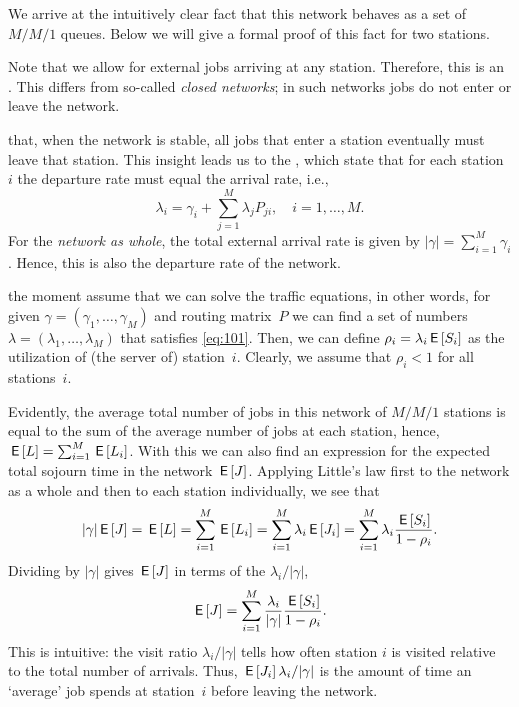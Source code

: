 We arrive at the intuitively clear fact that this network behaves as a set of $M/M/1$ queues. Below we will give a formal proof of this fact for two stations.


Note that we allow for external jobs arriving at any station.
Therefore, this is an .
This differs from so-called \emph{closed networks}; in such networks jobs do not enter or leave the network.

 that, when the network is stable, all jobs that enter a station eventually must leave that station.
This insight leads us to the , which state that for each station $i$ the departure rate must equal the arrival rate, i.e.,
\begin{equation}\label{eq:101}
  \lambda_i = \gamma_i + \sum_{j=1}^M \lambda_j P_{j i}, \quad i = 1, \ldots, M.
\end{equation}
For the \emph{network as whole}, the total external arrival rate is given by $|\gamma|= \sum_{i=1}^M \gamma_i$.
Hence, this is also the departure rate of the network.

 the moment assume that we can solve the traffic equations, in other words, for given $\gamma =(\gamma_1, \ldots, \gamma_M)$ and routing matrix~$P$ we can find a set of numbers $\lambda =(\lambda_1, \ldots, \lambda_M)$  that satisfies \cref{eq:101}.
Then, we can define $\rho_i = \lambda_i \,\mathsf{E}\left[S_i\right]$ as the utilization of (the server of) station~$i$.
Clearly, we assume that $\rho_i < 1$ for all stations~$i$.

Evidently, the average total number of jobs in this network of $M/M/1$ stations is equal to the sum of the average number of jobs at each station, hence,
$\,\mathsf{E}\left[L\right] = \sum_{i=1}^M \,\mathsf{E}\left[L_i\right]$.
With this we can also find an expression for the expected total sojourn time in the network $\,\mathsf{E}\left[J\right]$.
Applying Little's law first to the network as a whole and then to each station individually, we see that
\begin{equation*}
  |\gamma| \,\mathsf{E}\left[J\right] = \,\mathsf{E}\left[L\right] = \sum_{i=1}^M \,\mathsf{E}\left[L_i\right] = \sum_{i=1}^M \lambda_i \,\mathsf{E}\left[J_i\right] = \sum_{i=1}^M \lambda_i \frac{\,\mathsf{E}\left[S_i\right]}{1-\rho_i}.
\end{equation*}
Dividing by $|\gamma|$ gives  $\,\mathsf{E}\left[J\right]$  in terms of the  $\lambda_i/|\gamma|$,
\begin{equation*}
 \,\mathsf{E}\left[J\right] = \sum_{i=1}^M \frac{\lambda_i}{|\gamma|} \frac{\,\mathsf{E}\left[S_i\right]}{1-\rho_i}.
\end{equation*}
This is intuitive: the visit ratio $\lambda_i/|\gamma|$ tells how often station $i$ is visited relative to the total number of arrivals.
Thus, $\,\mathsf{E}\left[J_i\right] \lambda_i /|\gamma|$ is the amount of time an `average' job spends at station~$i$ before leaving the network.

